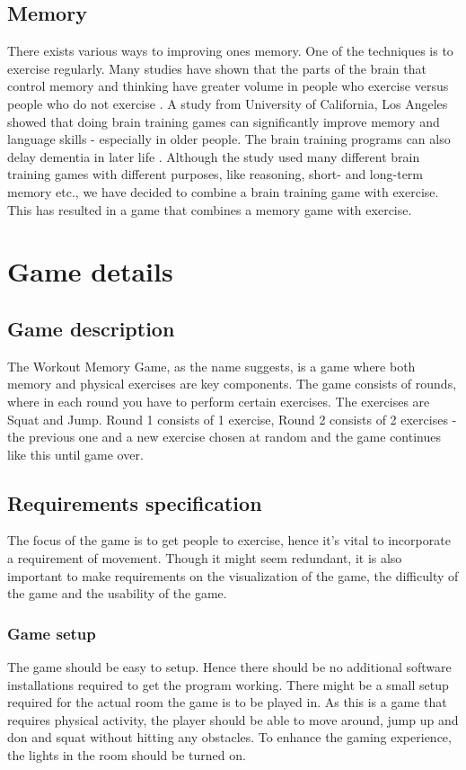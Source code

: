\documentclass[11pt]{report}
\begin{document}
\section{Memory}
There exists various ways to improving ones memory. One of the techniques is to exercise regularly. Many studies have shown that the parts of the brain that control memory and thinking have greater volume in people who exercise versus people who do not exercise \cite{harvard-health}. A study from University of California, Los Angeles showed that doing brain training games can significantly improve memory and language skills - especially in older people. The brain training programs can also delay dementia in later life \cite{dailymail}. Although the study used many different brain training games with different purposes, like reasoning, short- and long-term memory etc., we have decided to combine a brain training game with exercise. This has resulted in a game that combines a memory game with exercise.

\chapter{Game details}
\section{Game description}
The Workout Memory Game, as the name suggests, is a game where both memory and physical exercises are key components. The game consists of rounds, where in each round you have to perform certain exercises. The exercises are Squat and Jump. Round 1 consists of 1 exercise, Round 2 consists of 2 exercises - the previous one and a new exercise chosen at random and the game continues like this until game over.

\section{Requirements specification}
The focus of the game is to get people to exercise, hence it's vital to incorporate a requirement of movement. Though it might seem redundant, it is also important to make requirements on the visualization of the game, the difficulty of the game and the usability of the game.

\subsection{Game setup}
The game should be easy to setup. Hence there should be no additional software installations required to get the program working. There might be a small setup required for the actual room the game is to be played in. As this is a game that requires physical activity, the player should be able to move around, jump up and don and squat without hitting any obstacles. To enhance the gaming experience, the lights in the room should be turned on.
\end{document}

